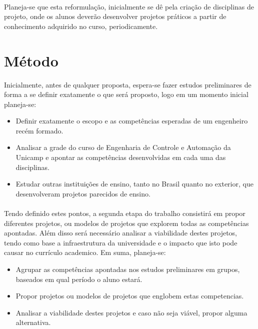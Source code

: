 \documentclass[12pt]{article} %
\begin{document}
\paragraph{}Planeja-se que esta reformulação, inicialmente se dê pela criação de disciplinas de projeto, onde os alunos deverão desenvolver projetos práticos a partir de conhecimento adquirido no curso, periodicamente.


\section{Método}

Inicialmente, antes de qualquer proposta, espera-se fazer estudos preliminares de forma a se definir exatamente o que será proposto, logo em um momento inicial planeja-se:

\begin{itemize}
\setlength\itemsep{0.01mm}
\item Definir exatamente o escopo e as competências esperadas de um engenheiro recém formado.
\item Analisar a grade do curso de Engenharia de Controle e Automação da Unicamp e apontar as competências desenvolvidas em cada uma das disciplinas.
\item Estudar outras instituições de ensino, tanto no Brasil quanto no exterior, que desenvolveram projetos parecidos de ensino.
\end{itemize}

\paragraph{} Tendo definido estes pontos, a segunda etapa do trabalho consistirá em propor diferentes projetos, ou modelos de projetos que explorem todas as competências apontadas. Além disso será necessário analisar a viabilidade destes projetos, tendo como base a infraestrutura da universidade e o impacto que isto pode causar no currículo academico. Em suma, planeja-se:

\begin{itemize}
\setlength\itemsep{0.01mm}
\item Agrupar as competências apontadas nos estudos preliminares em grupos, baseados em qual período o aluno estará.
\item Propor projetos ou modelos de projetos que englobem estas competencias.
\item Analisar a viabilidade destes projetos e caso não seja viável, propor alguma alternativa.
\end{itemize}
\end{document}
